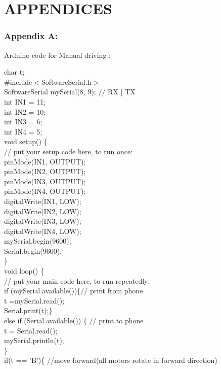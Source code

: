 \documentclass[12pt,a4paper]{report}
\begin{document}



\chapter*{APPENDICES} 
\subsection*{Appendix A:}
{\large Arduino code for Manual driving :}

char t;\\
\#include$<$SoftwareSerial.h$>$ \\
SoftwareSerial mySerial(8, 9); // RX | TX \\
int IN1 = 11;\\
int IN2 = 10;\\
int IN3 = 6;\\
int IN4 = 5;\\
void setup() \{\\
// put your setup code here, to run once:\\
  pinMode(IN1, OUTPUT);\\
  pinMode(IN2, OUTPUT);\\
  pinMode(IN3, OUTPUT);\\
  pinMode(IN4, OUTPUT);\\
  digitalWrite(IN1, LOW);\\
  digitalWrite(IN2, LOW);\\
  digitalWrite(IN3, LOW);\\
  digitalWrite(IN4, LOW);\\
  mySerial.begin(9600);\\
  Serial.begin(9600);\\
\}\\
void loop() \{\\
  // put your main code here, to run repeatedly:\\
  if (mySerial.available())\{// print from phone\\
    t =mySerial.read();\\
    Serial.print(t);\}\\ 
  else if (Serial.available()) \{ // print to phone\\
    t = Serial.read();\\
    mySerial.println(t);\\
  \} \\
if(t == 'B')\{            //move forward(all motors rotate in forward direction)\\
\end{document}
